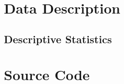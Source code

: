 \documentclass[../thesis.tex]{subfiles}
\begin{document}
\appendix

\chapter{Data Description}
\label{chap:data_desc}

\section{Descriptive Statistics}



\chapter{Source Code}
\label{chap:souce_code}
\end{document}
